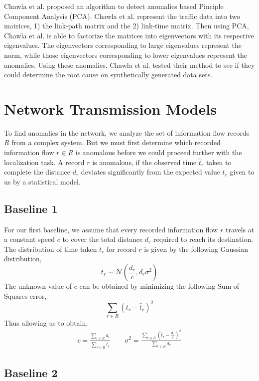 \documentclass[draft]{sig-alternate}
\begin{document}
Chawla et al. \cite{Chawla2012} proposed an algorithm to detect anomalies based Pinciple Component Analysis (PCA). Chawla et al. \cite{Chawla2012} represent the traffic data into two matrices, 1) the link-path matrix and the 2) link-time matrix. Then using PCA, Chawla et al. \cite{Chawla2012} is able to factorize the matrices into eigenvectors with its respective eigenvalues. The eigenvectors corresponding to large eigenvalues represent the norm, while those eigenvectors corresponding to lower eigenvalues represent the anomalies. Using these anomalies, Chawla et al. \cite{Chawla2012} tested their method to see if they could determine the root cause on synthetically generated data sets.

\section{Network Transmission Models}
\label{sec:models}

To find anomalies in the network, we analyze the set of information flow records $R$ from a complex system. But we must first determine which recorded information flow $r \in R$ is anomalous before we could proceed further with the localization task. A record $r$ is anomalous, if the observed time $\hat{t}_r$ taken to complete the distance $d_r$ deviates significantly from the expected value $t_r$ given to us by a statistical model.

\subsection{Baseline 1}

For our first baseline, we assume that every recorded information flow $r$ travels at a constant speed $c$ to cover the total distance $d_r$ required to reach its destination. The distribution of time taken $t_r$ for record $r$ is given by the following Gaussian distribution,
\[ t_r \sim \mathcal{N} \left( \frac{d_r}{c}, d_r \sigma^2 \right) \]
The unknown value of $c$ can be obtained by minimizing the following Sum-of-Squares error,
\[ \sum_{r \in R} (t_r - \hat{t}_r)^2 \]
Thus allowing us to obtain,
\begin{gather*}
	c = \frac{\sum_{r \in R} d_r}{\sum_{r \in R} \hat{t}_r} \qquad
    \sigma^2 = \frac{ \sum_{r \in R} \left( \hat{t}_r - \frac{d_r}{c} \right)^2 }{ \sum_{r \in R} d_r }
\end{gather*}

\subsection{Baseline 2}
\end{document}
